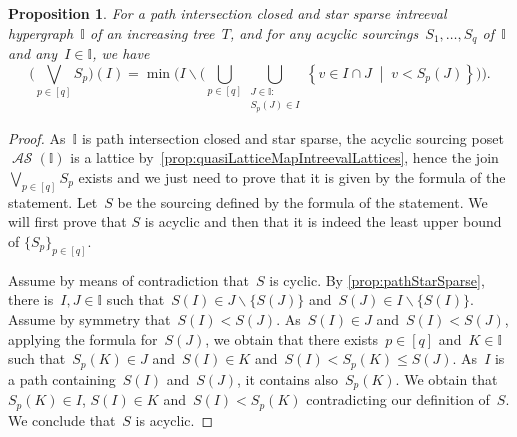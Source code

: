 \documentclass{amsart}
\newtheorem{proposition}[theorem]{Proposition}
\theoremstyle{definition}
\newcommand{\set}[2]{\left\{ #1 \;\middle|\; #2 \right\}} %
\newcommand{\ssm}{\smallsetminus} %
\newcommand{\bigJoin}{\bigvee} %
\DeclareMathOperator{\ASour}{\mathcal{AS}}  %
\newcommand{\II}{\mathbb I} %
\begin{document}
\begin{proposition}
\label{prop:expressionJoin}
For a path intersection closed and star sparse intreeval hypergraph~$\II$ of an increasing tree~$T$, and for any acyclic sourcings~$S_1, \dots, S_q$ of~$\II$ and any~$I \in \II$, we have
\[
\bigg( \bigJoin_{p \in [q]} S_p \bigg)(I) = \min \bigg( I \ssm \Big( \bigcup_{p \in [q]} \bigcup_{\substack{J \in \II : \\ S_p(J) \in I}} \set{v \in I \cap J}{v < S_p(J)} \Big) \bigg).
\]
\end{proposition}

\begin{proof}
As~$\II$ is path intersection closed and star sparse, the acyclic sourcing poset~$\ASour(\II)$ is a lattice by~\cref{prop:quasiLatticeMapIntreevalLattices}, hence the join~$\bigJoin_{p \in [q]} S_p$ exists and we just need to prove that it is given by the formula of the statement.
Let~$S$ be the sourcing defined by the formula of the statement.
We will first prove that $S$ is acyclic and then that it is indeed the least upper bound of $\{S_p\}_{p \in [q]}$.

Assume by means of contradiction that~$S$ is cyclic.
By \cref{prop:pathStarSparse}, there is~$I,J \in \II$ such that~$S(I) \in J \ssm \{S(J)\}$ and~$S(J) \in I \ssm \{S(I)\}$.
Assume by symmetry that~$S(I) < S(J)$.
As~$S(I) \in J$ and~$S(I) < S(J)$, applying the formula for~$S(J)$, we obtain that there exists~$p \in [q]$ and~$K \in \II$ such that~$S_p(K) \in J$ and~$S(I) \in K$ and~$S(I) < S_p(K) \le S(J)$.
As~$I$ is a path containing~$S(I)$ and~$S(J)$, it contains also~$S_p(K)$.
We obtain that~$S_p(K) \in I$, $S(I) \in K$ and~$S(I) < S_p(K)$ contradicting our definition of~$S$.
We conclude that~$S$ is acyclic.



\end{proof}
\end{document}
